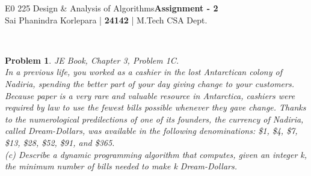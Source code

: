 \documentclass[12pt]{article}
\newtheorem{problem}{Problem}
\begin{document}
\noindent E0 225 Design \& Analysis of Algorithms\hfill \textbf{Assignment - 2}\\
Sai Phanindra Korlepara | \textbf{24142} | M.Tech CSA Dept.

\hrulefill %
\\
\begin{problem}
 JE Book, Chapter 3, Problem 1C. \\
 \indent In a previous life, you worked as a cashier in the lost Antarctican colony of Nadiria, spending the better part of your day giving change to your customers. Because paper is a very rare and valuable resource in Antarctica, cashiers were required by law to use the fewest bills possible whenever they gave change. Thanks to the numerological predilections of one of its founders, the currency of Nadiria, called Dream-Dollars, was available in the following denominations: \$1, \$4, \$7, \$13, \$28, \$52, \$91, and \$365.\\
 \indent (c) Describe a dynamic programming algorithm that computes, given an integer k, the minimum number of bills needed to make k Dream-Dollars.
\end{problem}

\end{document}
